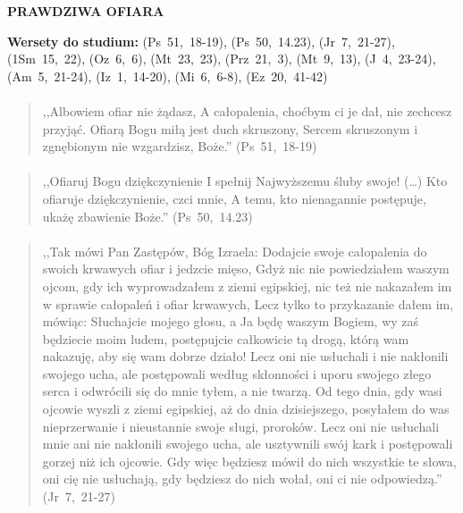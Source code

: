 \documentclass[10pt,a4paper,oneside]{article}
\begin{document}
\centerline{\textbf{\MakeUppercase{Prawdziwa ofiara}}}
\begin{center}
\textbf{Wersety do studium:} 
\mbox{(Ps 51, 18-19)}, \mbox{(Ps 50, 14.23)}, \mbox{(Jr 7, 21-27)}, \mbox{(1Sm 15, 22)}, \mbox{(Oz 6, 6)}, \mbox{(Mt 23, 23)}, \mbox{(Prz 21, 3)}, \mbox{(Mt 9, 13)}, \mbox{(J 4, 23-24)}, \mbox{(Am 5, 21-24)}, \mbox{(Iz 1, 14-20)}, \mbox{(Mi 6, 6-8)}, \mbox{(Ez 20, 41-42)}
\end{center}
\paragraph{}
\begin{quote}
,,Albowiem ofiar nie żądasz, A całopalenia, choćbym ci je dał, nie zechcesz przyjąć. Ofiarą Bogu miłą jest duch skruszony, Sercem skruszonym i zgnębionym nie wzgardzisz, Boże.'' \mbox{(Ps 51, 18-19)}
\end{quote}
\paragraph{}
\begin{quote}
,,Ofiaruj Bogu dziękczynienie I spełnij Najwyższemu śluby swoje! (\ldots) Kto ofiaruje dziękczynienie, czci mnie, A temu, kto nienagannie postępuje, ukażę zbawienie Boże.'' \mbox{(Ps 50, 14.23)}
\end{quote}
\paragraph{}
\begin{quote}
,,Tak mówi Pan Zastępów, Bóg Izraela: Dodajcie swoje całopalenia do swoich krwawych ofiar i jedzcie mięso, Gdyż nic nie powiedziałem waszym ojcom, gdy ich wyprowadzałem z ziemi egipskiej, nic też nie nakazałem im w sprawie całopaleń i ofiar krwawych, Lecz tylko to przykazanie dałem im, mówiąc: Słuchajcie mojego głosu, a Ja będę waszym Bogiem, wy zaś będziecie moim ludem, postępujcie całkowicie tą drogą, którą wam nakazuję, aby się wam dobrze działo! Lecz oni nie usłuchali i nie nakłonili swojego ucha, ale postępowali według skłonności i uporu swojego złego serca i odwrócili się do mnie tyłem, a nie twarzą. Od tego dnia, gdy wasi ojcowie wyszli z ziemi egipskiej, aż do dnia dzisiejszego, posyłałem do was nieprzerwanie i nieustannie swoje sługi, proroków. Lecz oni nie usłuchali mnie ani nie nakłonili swojego ucha, ale usztywnili swój kark i postępowali gorzej niż ich ojcowie. Gdy więc będziesz mówił do nich wszystkie te słowa, oni cię nie usłuchają, gdy będziesz do nich wołał, oni ci nie odpowiedzą.'' \mbox{(Jr 7, 21-27)}
\end{quote}
\end{document}
